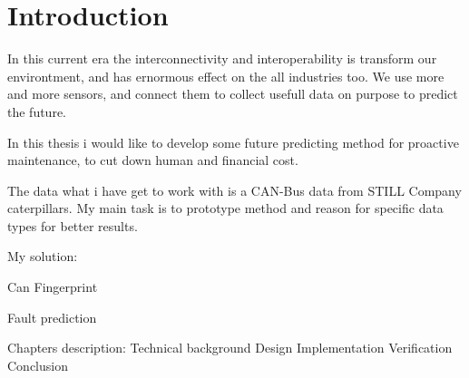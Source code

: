 \chapter*{Introduction}

In this current era the interconnectivity and interoperability is transform our environtment, and has ernormous effect on the all industries too. We use more and more sensors, and connect them to collect usefull data on purpose to predict the future.

In this thesis i would like to develop some future predicting method for proactive maintenance, to cut down human and financial cost.

The data what i have get to work with is a CAN-Bus data from STILL Company caterpillars. My main task is to prototype method and reason for specific data types for better results.


My solution: 

Can Fingerprint

Fault prediction


Chapters description:
Technical background
Design
Implementation
Verification
Conclusion


